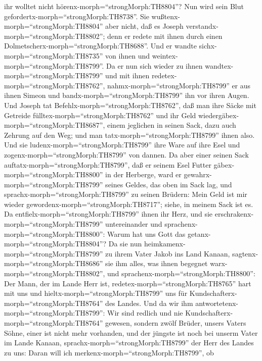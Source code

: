 ihr wolltet nicht hörenx-morph=``strongMorph:TH8804''? Nun wird sein
Blut gefordertx-morph=``strongMorph:TH8738''.  Sie
wußtenx-morph=``strongMorph:TH8804'' aber nicht, daß es Joseph
verstandx-morph=``strongMorph:TH8802''; denn er redete mit ihnen durch
einen Dolmetscherx-morph=``strongMorph:TH8688''.  Und er
wandte sichx-morph=``strongMorph:TH8735'' von ihnen und
weintex-morph=``strongMorph:TH8799''. Da er nun sich wieder zu ihnen
wandtex-morph=``strongMorph:TH8799'' und mit ihnen
redetex-morph=``strongMorph:TH8762'', nahmx-morph=``strongMorph:TH8799''
er aus ihnen Simeon und bandx-morph=``strongMorph:TH8799'' ihn vor ihren
Augen.  Und Joseph tat
Befehlx-morph=``strongMorph:TH8762'', daß man ihre Säcke mit Getreide
fülltex-morph=``strongMorph:TH8762'' und ihr Geld
wiedergäbex-morph=``strongMorph:TH8687'', einem jeglichen in seinen
Sack, dazu auch Zehrung auf den Weg; und man
tatx-morph=``strongMorph:TH8799'' ihnen also.  Und sie
ludenx-morph=``strongMorph:TH8799'' ihre Ware auf ihre Esel und
zogenx-morph=``strongMorph:TH8799'' von dannen.  Da aber
einer seinen Sack auftatx-morph=``strongMorph:TH8799'', daß er seinem
Esel Futter gäbex-morph=``strongMorph:TH8800'' in der Herberge, ward er
gewahrx-morph=``strongMorph:TH8799'' seines Geldes, das oben im Sack
lag,  und sprachx-morph=``strongMorph:TH8799'' zu seinen
Brüdern: Mein Geld ist mir wieder
gewordenx-morph=``strongMorph:TH8717''; siehe, in meinem Sack ist es. Da
entfielx-morph=``strongMorph:TH8799'' ihnen ihr Herz, und sie
erschrakenx-morph=``strongMorph:TH8799'' untereinander und
sprachenx-morph=``strongMorph:TH8800'': Warum hat uns Gott das
getanx-morph=``strongMorph:TH8804''?  Da sie nun
heimkamenx-morph=``strongMorph:TH8799'' zu ihrem Vater Jakob ins Land
Kanaan, sagtenx-morph=``strongMorph:TH8686'' sie ihm alles, was ihnen
begegnet warx-morph=``strongMorph:TH8802'', und
sprachenx-morph=``strongMorph:TH8800'':  Der Mann, der im
Lande Herr ist, redetex-morph=``strongMorph:TH8765'' hart mit uns und
hieltx-morph=``strongMorph:TH8799'' uns für
Kundschafterx-morph=``strongMorph:TH8764'' des Landes.  Und
da wir ihm antwortetenx-morph=``strongMorph:TH8799'': Wir sind redlich
und nie Kundschafterx-morph=``strongMorph:TH8764'' gewesen,
 sondern zwölf Brüder, unsers Vaters Söhne, einer ist nicht
mehr vorhanden, und der jüngste ist noch bei unserm Vater im Lande
Kanaan,  sprachx-morph=``strongMorph:TH8799'' der Herr des
Landes zu uns: Daran will ich merkenx-morph=``strongMorph:TH8799'', ob
